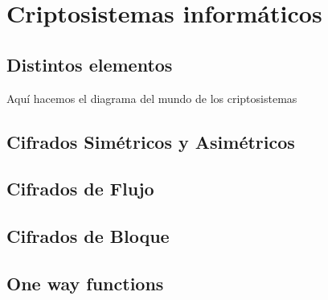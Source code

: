 \chapter{Criptosistemas informáticos}
\section{Distintos elementos}
Aquí hacemos el diagrama del mundo de los criptosistemas
\section{Cifrados Simétricos y Asimétricos}
\section{Cifrados de Flujo}
\section{Cifrados de Bloque}
\section{One way functions}
